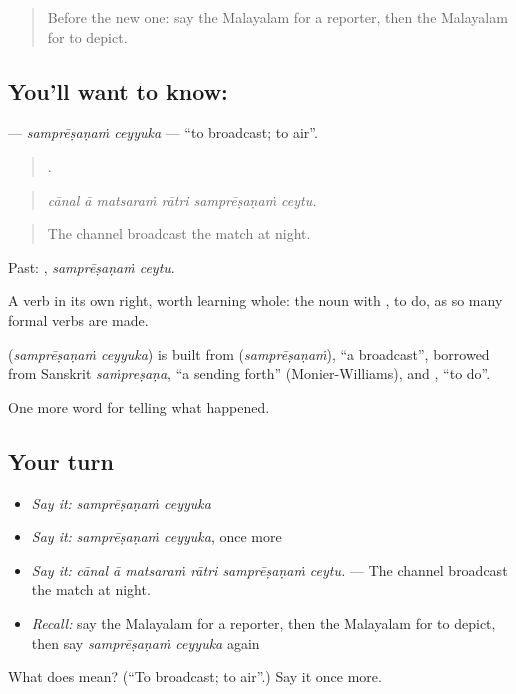 \label{lesson:ML-C351-sampresanam-ceyyuka}



\begin{quote}
Before the new one: say the Malayalam for a reporter, then the Malayalam for to depict.
\end{quote}

\subsection*{You'll want to know:  }
\textbf{ } — \emph{samprēṣaṇaṁ ceyyuka} — \textquotedblleft{}to broadcast; to air\textquotedblright{}.

\begin{quote}
     .
\end{quote}

\begin{quote}
\emph{cānal ā matsaraṁ rātri samprēṣaṇaṁ ceytu.}
\end{quote}

\begin{quote}
The channel broadcast the match at night.
\end{quote}

Past:  , \emph{samprēṣaṇaṁ ceytu}.

A verb in its own right, worth learning whole: the noun with , to do, as so many formal verbs are made.

\begin{cousinweb}
\textbf{ } (\emph{samprēṣaṇaṁ ceyyuka}) is built from  (\emph{samprēṣaṇaṁ}), \textquotedblleft{}a broadcast\textquotedblright{}, borrowed from Sanskrit \emph{saṁpreṣaṇa}, \textquotedblleft{}a sending forth\textquotedblright{} (Monier-Williams), and , \textquotedblleft{}to do\textquotedblright{}.
\end{cousinweb}

\begin{grammarlens}[title={What you've built}]
One more word for telling what happened.
\end{grammarlens}

\subsection*{Your turn}
\begin{itemize}
\raggedright
  \item \emph{Say it:} \emph{samprēṣaṇaṁ ceyyuka}
  \item \emph{Say it:} \emph{samprēṣaṇaṁ ceyyuka}, once more
  \item \emph{Say it:} \emph{cānal ā matsaraṁ rātri samprēṣaṇaṁ ceytu.} — The channel broadcast the match at night.
  \item \emph{Recall:} say the Malayalam for a reporter, then the Malayalam for to depict, then say \emph{samprēṣaṇaṁ ceyyuka} again
\end{itemize}

\begin{tcolorbox}[breakable,colback=teal!4,colframe=teal!35!black,title={Before you move on}]
What does   mean? (\textquotedblleft{}To broadcast; to air\textquotedblright{}.) Say it once more.
\end{tcolorbox}
